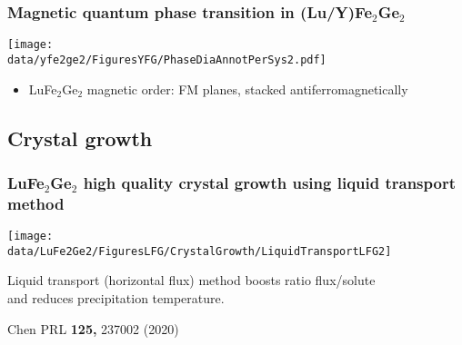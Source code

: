 

\begin{frame}[label=YFGIntro2b]
\frametitle{Magnetic quantum phase transition in (Lu/Y)Fe$_2$Ge$_2$}
\centerline{\texttt{[image: \\data/yfe2ge2/FiguresYFG/PhaseDiaAnnotPerSys2.pdf]}}
\begin{itemize}
\item 
LuFe$_2$Ge$_2$ magnetic order: FM planes, stacked antiferromagnetically
%
\end{itemize}
\end{frame}




\subsection{Crystal growth}
\begin{frame}[label=LFGGrowth]
\frametitle{LuFe$_2$Ge$_2$ high quality crystal growth using liquid transport method}
\centerline{\texttt{[image: \\data/LuFe2Ge2/FiguresLFG/CrystalGrowth/LiquidTransportLFG2]}}

\begin{center}
Liquid transport (horizontal flux) method boosts ratio flux/solute \\
and reduces precipitation temperature.
\end{center}
\vspace*{\fill}
\centerline{\makebox[\linewidth]{\rule{0.85\textwidth}{0.4pt}}}
\centerline{\scriptsize Chen PRL {\bf 125,} 237002 (2020)}
\end{frame}




